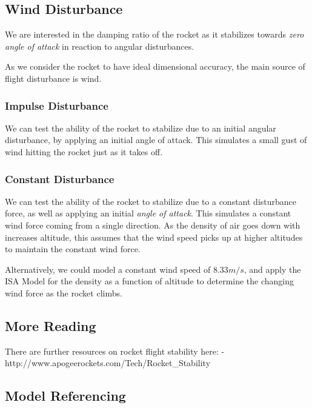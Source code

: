 \documentclass[]{article}
\begin{document}
\subsection{Wind Disturbance}\label{wind-disturbance}

We are interested in the damping ratio of the rocket as it stabilizes
towards \emph{zero angle of attack} in reaction to angular disturbances.

As we consider the rocket to have ideal dimensional accuracy, the main
source of flight disturbance is wind.

\subsubsection{Impulse Disturbance}\label{impulse-disturbance}

We can test the ability of the rocket to stabilize due to an initial
angular disturbance, by applying an initial angle of attack. This
simulates a small gust of wind hitting the rocket just as it takes off.

\subsubsection{Constant Disturbance}\label{constant-disturbance}

We can test the ability of the rocket to stabilize due to a constant
disturbance force, as well as applying an initial \emph{angle of
attack}. This simulates a constant wind force coming from a single
direction. As the density of air goes down with increases altitude, this
assumes that the wind speed picks up at higher altitudes to maintain the
constant wind force.

Alternatively, we could model a constant wind speed of \(8.33 m/s\), and
apply the ISA Model for the density as a function of altitude to
determine the changing wind force as the rocket climbs.

\subsection{More Reading}\label{more-reading}

There are further resources on rocket flight stability here: -
http://www.apogeerockets.com/Tech/Rocket\_Stability

\clearpage

\subsection{Model Referencing}\label{model-referencing}
\end{document}
